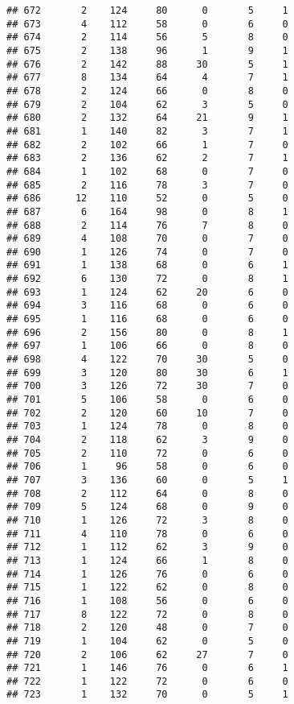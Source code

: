\documentclass[
]{article}
\begin{document}
\begin{verbatim}
## 672       2    124     80      0       5     1
## 673       4    112     58      0       6     0
## 674       2    114     56      5       8     0
## 675       2    138     96      1       9     1
## 676       2    142     88     30       5     1
## 677       8    134     64      4       7     1
## 678       2    124     66      0       8     0
## 679       2    104     62      3       5     0
## 680       2    132     64     21       9     1
## 681       1    140     82      3       7     1
## 682       2    102     66      1       7     0
## 683       2    136     62      2       7     1
## 684       1    102     68      0       7     0
## 685       2    116     78      3       7     0
## 686      12    110     52      0       5     0
## 687       6    164     98      0       8     1
## 688       2    114     76      7       8     0
## 689       4    108     70      0       7     0
## 690       1    126     74      0       7     0
## 691       1    138     68      0       6     1
## 692       6    130     72      0       8     1
## 693       1    124     62     20       6     0
## 694       3    116     68      0       6     0
## 695       1    116     68      0       6     0
## 696       2    156     80      0       8     1
## 697       1    106     66      0       8     0
## 698       4    122     70     30       5     0
## 699       3    120     80     30       6     1
## 700       3    126     72     30       7     0
## 701       5    106     58      0       6     0
## 702       2    120     60     10       7     0
## 703       1    124     78      0       8     0
## 704       2    118     62      3       9     0
## 705       2    110     72      0       6     0
## 706       1     96     58      0       6     0
## 707       3    136     60      0       5     1
## 708       2    112     64      0       8     0
## 709       5    124     68      0       9     0
## 710       1    126     72      3       8     0
## 711       4    110     78      0       6     0
## 712       1    112     62      3       9     0
## 713       1    124     66      1       8     0
## 714       1    126     76      0       6     0
## 715       1    122     62      0       8     0
## 716       1    108     56      0       6     0
## 717       8    122     72      0       8     0
## 718       2    120     48      0       7     0
## 719       1    104     62      0       5     0
## 720       2    106     62     27       7     0
## 721       1    146     76      0       6     1
## 722       1    122     72      0       6     0
## 723       1    132     70      0       5     1

\end{verbatim}
\end{document}
